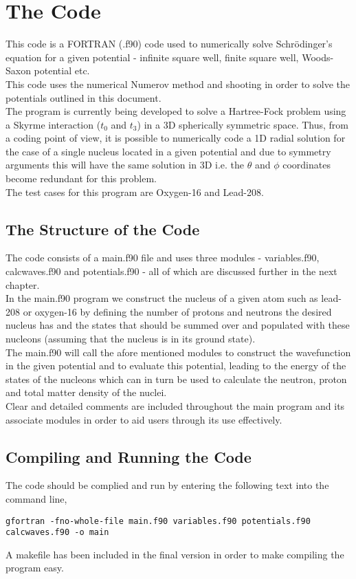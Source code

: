 \documentclass[11pt]{report}
\begin{document}
\maketitle
\tableofcontents
\chapter{The Code}
This code is a FORTRAN (.f90) code used to numerically solve Schrödinger's equation for a given potential - infinite square well, finite square well, Woods-Saxon potential etc. \\
This code uses the numerical Numerov method and shooting in order to solve the potentials outlined in this document. \\
The program is currently being developed to solve a Hartree-Fock problem using a Skyrme interaction ($t_{0}$ and $t_{3}$) in a 3D spherically symmetric space. Thus, from a coding point of view, it is possible to numerically code a 1D radial solution for the case of a single nucleus located in a given potential and due to symmetry arguments this will have the same solution in 3D i.e. the $\theta$ and $\phi$ coordinates become redundant for this problem. \\
The test cases for this program are Oxygen-16 and Lead-208. 
\section{The Structure of the Code}
The code consists of a main.f90 file and uses three modules - variables.f90, calcwaves.f90 and potentials.f90 - all of which are discussed further in the next chapter. \\
In the main.f90 program we construct the nucleus of a given atom such as lead-208 or oxygen-16 by defining the number of protons and neutrons the desired nucleus has and the states that should be summed over and populated with these nucleons (assuming that the nucleus is in its ground state). \\
The main.f90 will call the afore mentioned modules to construct the wavefunction in the given potential and to evaluate this potential, leading to the energy of the states of the nucleons which can in turn be used to calculate the neutron, proton and total matter density of the nuclei. \\  
Clear and detailed comments are included throughout the main program and its associate modules in order to aid users through its use effectively.  
\section{Compiling and Running the Code}
The code should be complied and run by entering the following text into the command line, 
\begin{verbatim}
gfortran -fno-whole-file main.f90 variables.f90 potentials.f90 calcwaves.f90 -o main
\end{verbatim}
A makefile has been included in the final version in order to make compiling the program easy.  
\end{document}
